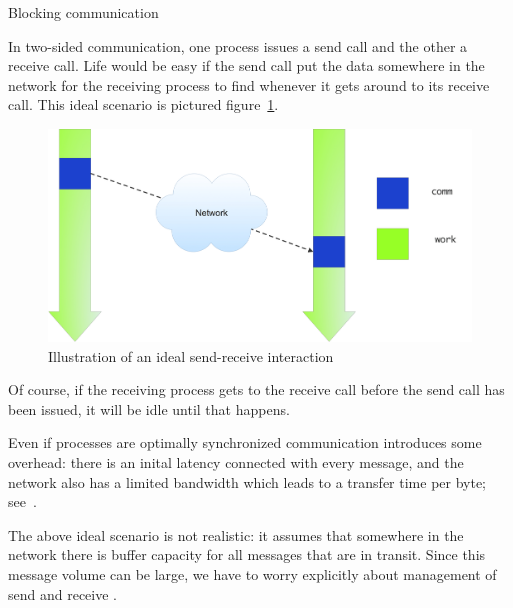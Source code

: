  {Blocking communication}

In two-sided communication, one process issues a send call and the
other a receive call. Life would be easy if the send call put the data
somewhere in the network for the receiving process to find whenever it
gets around to its receive call. This ideal scenario is pictured
figure~\ref{fig:send-ideal}.
\begin{figure}[ht]
\includegraphics[scale=.1]{graphics-public/send-ideal}
\caption{Illustration of an ideal send-receive interaction}
\label{fig:send-ideal}
\end{figure}
Of course, if the receiving process gets to the receive call before
the send call has been issued, it will be idle until that happens.

Even if processes are optimally synchronized communication introduces
some overhead: there is an inital latency connected with every
message, and the network also has a limited bandwidth which leads to a
transfer time per byte; see~.

The above ideal scenario is not realistic: it assumes that somewhere
in the network there is buffer capacity for all messages that are in
transit. Since this message volume can be large, we have to worry
explicitly about management of send and receive .

